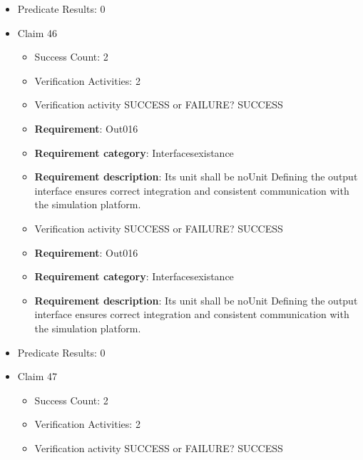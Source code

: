 \documentclass{article}
\begin{document}
\begin{itemize}
\begin{itemize}
					\item Verification activity SUCCESS or FAILURE? SUCCESS
		
						\item \textbf{Requirement}: Out015 
						\item \textbf{Requirement category}: Interfacesexistance 
						\item \textbf{Requirement description}: Its unit shall be Nm Defining the output interface ensures correct integration and consistent communication with the simulation platform.
					
				\end{itemize}
				
									    
				\item Predicate Results: 0

  				  \item Claim 46
				\begin{itemize}
			    	\item Success Count: 2 
			    	\item Verification Activities: 2
					\item Verification activity SUCCESS or FAILURE? SUCCESS
		
						\item \textbf{Requirement}: Out016 
						\item \textbf{Requirement category}: Interfacesexistance 
						\item \textbf{Requirement description}: Its unit shall be noUnit Defining the output interface ensures correct integration and consistent communication with the simulation platform.
					
					\item Verification activity SUCCESS or FAILURE? SUCCESS
		
						\item \textbf{Requirement}: Out016 
						\item \textbf{Requirement category}: Interfacesexistance 
						\item \textbf{Requirement description}: Its unit shall be noUnit Defining the output interface ensures correct integration and consistent communication with the simulation platform.
					
				\end{itemize}
				
									    
				\item Predicate Results: 0

  				  \item Claim 47
				\begin{itemize}
			    	\item Success Count: 2 
			    	\item Verification Activities: 2
					\item Verification activity SUCCESS or FAILURE? SUCCESS
		

\end{itemize}
\end{itemize}
\end{document}
